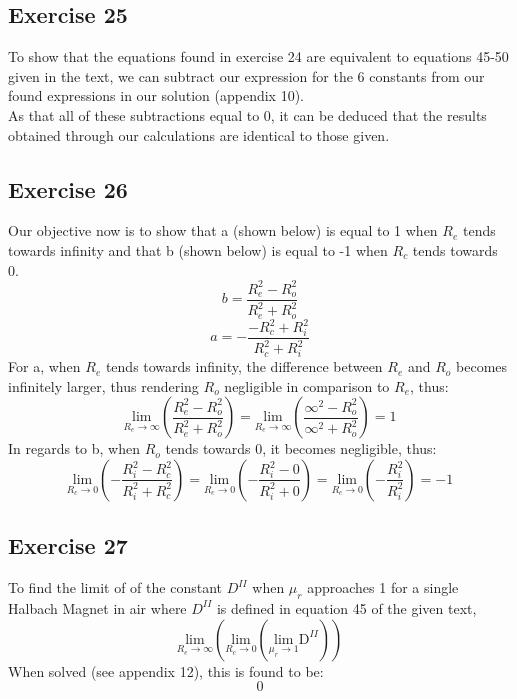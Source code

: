 \documentclass{article}
\begin{document}
\subsection{Exercise 25}
To show that the equations found in exercise 24 are  equivalent to equations 45-50 given in the text, we can subtract our expression for the 6 constants from our found expressions in our solution (appendix 10). 
\\
As that all of these subtractions equal to 0, it can be deduced that the results obtained through our calculations are identical to those given. 

\subsection{Exercise 26}
Our objective now is to show that a (shown below) is equal to 1 when $R_e$ tends towards infinity and that b (shown below) is equal to -1 when $R_c$ tends towards 0. 
\begin{equation}
    b = \frac{R_{e}^{2}-R_{o}^{2}}{R_{e}^{2}+R_{o}^{2}}
\end{equation}
\begin{equation}
   a = -\frac{-R_{c}^{2}+R_{i}^{2}}{R_{c}^{2}+R_{i}^{2}}
\end{equation}
For a, when $R_e$ tends towards infinity, the difference between $R_e$ and $R_o$ becomes infinitely larger, thus rendering $R_o$ negligible in comparison to $R_e$, thus: 
\begin{equation}
    \underset{R_{e}\rightarrow\infty}{\mathrm{lim}}\left(\frac{R_{e}^{2}-R_{o}^{2}}{R_{e}^{2}+R_{o}^{2}}\right)=\underset{R_{e}\rightarrow\infty}{\mathrm{lim}}\left(\frac{\infty^{2}-R_{o}^{2}}{\infty^{2}+R_{o}^{2}}\right)=1
\end{equation}
In regards to b, when $R_o$ tends towards 0, it becomes negligible, thus:
\begin{equation}
    \underset{R_{c}\rightarrow0}{\mathrm{lim}}\left(-\frac{R_{i}^{2}-R_{c}^{2}}{R_{i}^{2}+R_{c}^{2}}\right)=\underset{R_{c}\rightarrow0}{\mathrm{lim}}\left(-\frac{R_{i}^{2}-0}{R_{i}^{2}+0}\right)=\underset{R_{c}\rightarrow0}{\mathrm{lim}}\left(-\frac{R_{i}^{2}}{R_{i}^{2}}\right)=-1
\end{equation}
\subsection{Exercise 27}
To find the limit of of the constant $D^{II}$ when $\mu_r$ approaches 1 for a single Halbach Magnet in air where $D^{II}$ is defined in equation 45 of the given text,
\begin{equation}
    \underset{{R_{e}\rightarrow\infty}}{\mathrm{lim}}\left(\underset{R_{c}\rightarrow0}{\mathrm{lim}}\left(\underset{\mu_{r}\rightarrow1}{\mathrm{lim}}\mathrm{D}^{\mathit{II}}\right)\right)
\end{equation}
When solved (see appendix 12), this is found to be:
\begin{equation}
    0
\end{equation}
\end{document}
